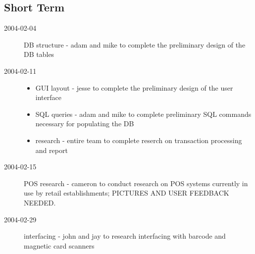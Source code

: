 \documentclass{article}
\begin{document}
\subsection{Short Term}
\begin{description}
    \item[2004-02-04] DB structure - adam and mike to complete the preliminary design of the DB tables
    \item[2004-02-11]
    \begin{itemize}
        \item GUI layout - jesse to complete the preliminary design of the user interface
        \item SQL queries - adam and mike to complete preliminary SQL commands necessary for populating the DB
        \item research - entire team to complete reserch on transaction processing and report
    \end{itemize}
    \item[2004-02-15] POS research - cameron to conduct research on POS systems currently in use by retail establishments; PICTURES AND USER FEEDBACK NEEDED.
    \item[2004-02-29] interfacing - john and jay to research interfacing with barcode and magnetic card scanners
\end{description}
\end{document}
